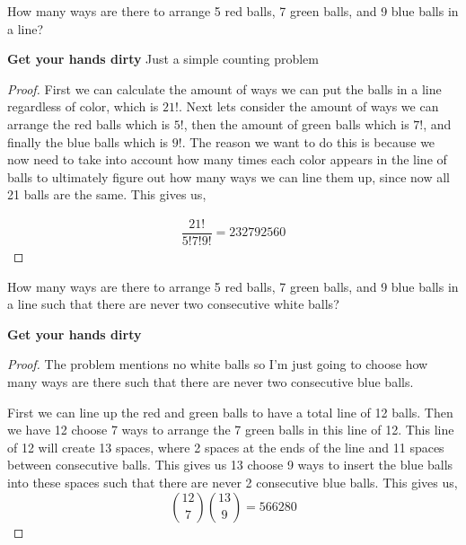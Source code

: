 \documentclass[11pt]{article}
\newenvironment{problem}[2][Problem\!]{\begin{trivlist}
\item[\hskip \labelsep {\bfseries #1}\hskip \labelsep {\bfseries #2}]}{\end{trivlist}}
\begin{document}
\begin{tcolorbox}
    \begin{problem} {OC | 11/01 | 71.}
        How many ways are there to arrange 5 red balls, 7 green balls, and 9 blue balls in a line?
    \end{problem}
    \textbf{Get your hands dirty} Just a simple counting problem
\end{tcolorbox}
\begin{proof}
    First we can calculate the amount of ways we can put the balls in a line regardless of color, which is $21!$. Next lets consider the amount of ways we can arrange the red balls which is $5!$, then the amount of green balls which is $7!$, and finally the blue balls which is $9!$. The reason we want to do this is because we now need to take into account how many times each color appears in the line of balls to ultimately figure out how many ways we can line them up, since now all 21 balls are the same. This gives us,

    \begin{align*}
        \dfrac{21!}{5!7!9!} = 232792560
    \end{align*}
\end{proof}

\begin{tcolorbox}
    \begin{problem} {OC | 11/01 | 72.}
        How many ways are there to arrange 5 red balls, 7 green balls, and 9 blue balls in a line such that there are never two consecutive white balls?
    \end{problem}
    \textbf{Get your hands dirty} 
\end{tcolorbox}

\begin{proof}
    The problem mentions no white balls so I'm just going to choose how many ways are there such that there are never two consecutive blue balls.

    First we can line up the red and green balls to have a total line of 12 balls. Then we have 12 choose 7 ways to arrange the 7 green balls in this line of 12. This line of 12 will create 13 spaces, where 2 spaces at the ends of the line and 11 spaces between consecutive balls. This gives us 13 choose 9 ways to insert the blue balls into these spaces such that there are never 2 consecutive blue balls. This gives us,
    \[\binom{12}{7}\binom{13}{9} = 566280\]
\end{proof}
\end{document}
